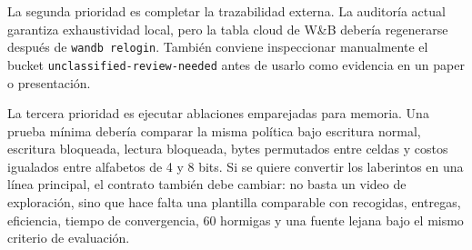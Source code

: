\documentclass[11pt,a4paper]{article}
\newcommand{\run}[1]{\nolinkurl{#1}}
\begin{document}
La segunda prioridad es completar la trazabilidad externa. La auditoría actual garantiza exhaustividad local, pero la tabla cloud de W\&B debería regenerarse después de \run{wandb relogin}. También conviene inspeccionar manualmente el bucket \run{unclassified-review-needed} antes de usarlo como evidencia en un paper o presentación.

La tercera prioridad es ejecutar ablaciones emparejadas para memoria. Una prueba mínima debería comparar la misma política bajo escritura normal, escritura bloqueada, lectura bloqueada, bytes permutados entre celdas y costos igualados entre alfabetos de 4 y 8 bits. Si se quiere convertir los laberintos en una línea principal, el contrato también debe cambiar: no basta un video de exploración, sino que hace falta una plantilla comparable con recogidas, entregas, eficiencia, tiempo de convergencia, 60 hormigas y una fuente lejana bajo el mismo criterio de evaluación.



\end{document}
